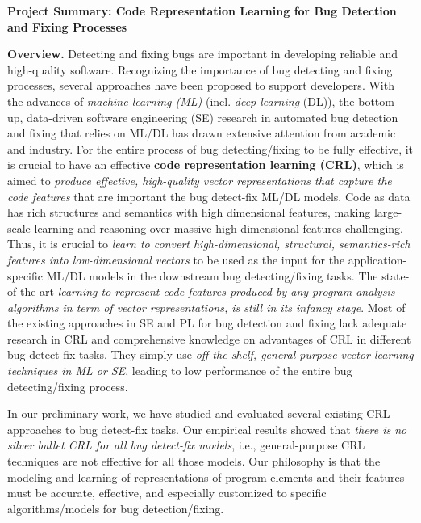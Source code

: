 \documentclass[11pt]{article}
\begin{document}

\begin{center}
  {\bf Project Summary: Code Representation Learning for Bug Detection and Fixing
    Processes}
\end{center}
\vspace{-.1in}


{\bf Overview.}
Detecting and fixing bugs are important in developing reliable and
high-quality software. Recognizing the importance of bug detecting and fixing processes,
several approaches have been proposed to support developers. With the
advances of {\em machine learning (ML)} (incl. {\em deep learning}
(DL)), the bottom-up, data-driven software engineering (SE) research
in automated bug detection and fixing that relies on ML/DL has drawn
extensive attention from academic and industry. For the entire process
of bug detecting/fixing to be fully effective, it is crucial to have
an effective {\bf code representation learning (CRL)}, which is aimed
to {\em produce effective, high-quality vector representations that
  capture the code features} that are important the bug detect-fix
ML/DL models. Code as data has rich structures and semantics with high
dimensional features, making large-scale learning and reasoning over
massive high dimensional features challenging. Thus, it is crucial to
{\em learn to convert high-dimensional, structural, semantics-rich
  features into low-dimensional vectors} to be used as the input for
the application-specific ML/DL models in the downstream bug
detecting/fixing tasks.  The state-of-the-art {\em learning to
  represent code features produced by any program analysis algorithms
  in term of vector representations, is still in its infancy
  stage}. Most of the existing approaches in SE and PL for bug
detection and fixing lack adequate research in CRL and comprehensive
knowledge on advantages of CRL in different bug detect-fix
tasks. They simply use {\em off-the-shelf, general-purpose vector
  learning techniques in ML or SE}, leading to low performance of the
entire bug detecting/fixing process.

In our preliminary work, we have studied and evaluated several
existing CRL approaches to bug detect-fix tasks. Our empirical results
showed that {\em there is no silver bullet CRL for all bug detect-fix
  models}, i.e., general-purpose CRL techniques are not effective for
all those models. Our philosophy is that the modeling and learning of
representations of program elements and their features must be
accurate, effective, and especially customized to specific
algorithms/models for bug detection/fixing.
\end{document}
